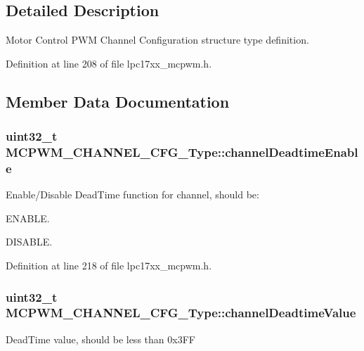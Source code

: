 \subsection{\-Detailed \-Description}
\-Motor \-Control \-P\-W\-M \-Channel \-Configuration structure type definition. 

\-Definition at line 208 of file lpc17xx\-\_\-mcpwm.\-h.



\subsection{\-Member \-Data \-Documentation}
\hypertarget{struct_m_c_p_w_m___c_h_a_n_n_e_l___c_f_g___type_a7f01b82a2dbff96760884fa0fd4a8f7d}{
\subsubsection[{channel\-Deadtime\-Enable}]{\setlength{\rightskip}{0pt plus 5cm}uint32\-\_\-t {\bf \-M\-C\-P\-W\-M\-\_\-\-C\-H\-A\-N\-N\-E\-L\-\_\-\-C\-F\-G\-\_\-\-Type\-::channel\-Deadtime\-Enable}}}\label{struct_m_c_p_w_m___c_h_a_n_n_e_l___c_f_g___type_a7f01b82a2dbff96760884fa0fd4a8f7d}
\-Enable/\-Disable \-Dead\-Time function for channel, should be\-:
\begin{DoxyItemize}
\item \-E\-N\-A\-B\-L\-E.
\item \-D\-I\-S\-A\-B\-L\-E. 
\end{DoxyItemize}

\-Definition at line 218 of file lpc17xx\-\_\-mcpwm.\-h.

\hypertarget{struct_m_c_p_w_m___c_h_a_n_n_e_l___c_f_g___type_a29dea1ec970a5aaaf7d45c67d67960ad}{
\subsubsection[{channel\-Deadtime\-Value}]{\setlength{\rightskip}{0pt plus 5cm}uint32\-\_\-t {\bf \-M\-C\-P\-W\-M\-\_\-\-C\-H\-A\-N\-N\-E\-L\-\_\-\-C\-F\-G\-\_\-\-Type\-::channel\-Deadtime\-Value}}}\label{struct_m_c_p_w_m___c_h_a_n_n_e_l___c_f_g___type_a29dea1ec970a5aaaf7d45c67d67960ad}
\-Dead\-Time value, should be less than 0x3\-F\-F 

